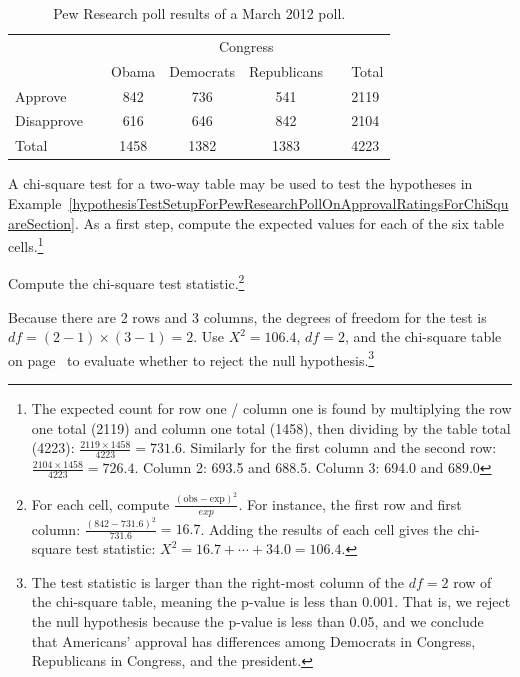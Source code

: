 \begin{table}
\centering
\begin{tabular}{ll ccc ll}
& & & \multicolumn{2}{c}{Congress} & \\
\cline{4-5}
 & \hspace{1mm} & Obama & Democrats & Republicans & \hspace{1mm} & Total \\
\hline
Approve				   & & 842    & 736 & 541   & 				& 2119 \\
Disapprove			   & & 616    & 646 & 842   &				& 2104 \\
\hline
Total					   & & 1458    & 1382 & 1383 & 				& 4223 \\
\hline
\end{tabular}
\caption{Pew Research poll results of a March 2012 poll.}
\label{pewResearchPollOnApprovalRatingsForChiSquareSectionExampleAndExercises}
\end{table}

\begin{exercise}
A chi-square test for a two-way table may be used to test the hypotheses in Example~\ref{hypothesisTestSetupForPewResearchPollOnApprovalRatingsForChiSquareSection}. As a first step, compute the expected values for each of the six table cells.\footnote{The expected count for row one / column one is found by multiplying the row one total (2119) and column one total (1458), then dividing by the table total (4223): $\frac{2119\times 1458}{4223} = 731.6$. Similarly for the first column and the second row: $\frac{2104\times 1458}{4223} = 726.4$. Column 2: 693.5 and 688.5. Column 3: 694.0 and 689.0}
\end{exercise}

\begin{exercise}
Compute the chi-square test statistic.\footnote{For each cell, compute $\frac{(\text{obs} - \text{exp})^2}{exp}$. For instance, the first row and first column: $\frac{(842-731.6)^2}{731.6} = 16.7$. Adding the results of each cell gives the chi-square test statistic: {\scriptsize$X^2 = 16.7 + \cdots + 34.0 = 106.4$}.}
\end{exercise}

\begin{exercise}
Because there are 2 rows and 3 columns, the degrees of freedom for the test is $df=(2-1)\times (3-1) = 2$. Use $X^2=106.4$, $df=2$, and the chi-square table on page~\pageref{chiSquareProbabilityTable} to evaluate whether to reject the null hypothesis.\footnote{The test statistic is larger than the right-most column of the $df=2$ row of the chi-square table, meaning the p-value is less than 0.001. That is, we reject the null hypothesis because the p-value is less than 0.05, and we conclude that Americans' approval has differences among Democrats in Congress, Republicans in Congress, and the president.}
\end{exercise}

